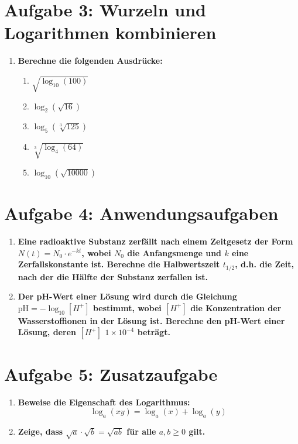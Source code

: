 \section*{\small Aufgabe 3: Wurzeln und Logarithmen kombinieren}
\begin{enumerate}
    \item \textbf{Berechne die folgenden Ausdrücke:}
    \begin{enumerate}
        \item \(\sqrt{\log_{10}(100)}\)
        \item \(\log_{2}(\sqrt{16})\)
        \item \(\log_{5}(\sqrt[3]{125})\)
        \item \(\sqrt[3]{\log_{4}(64)}\)
        \item \(\log_{10}(\sqrt{10000})\)
    \end{enumerate}
\end{enumerate}

\section*{\small Aufgabe 4: Anwendungsaufgaben}
\begin{enumerate}
    \item \textbf{Eine radioaktive Substanz zerfällt nach einem Zeitgesetz der Form \( N(t) = N_0 \cdot e^{-kt} \), wobei \(N_0\) die Anfangsmenge und \(k\) eine Zerfallskonstante ist. Berechne die Halbwertszeit \(t_{1/2}\), d.h. die Zeit, nach der die Hälfte der Substanz zerfallen ist.}
    
    \item \textbf{Der pH-Wert einer Lösung wird durch die Gleichung \( \text{pH} = -\log_{10}[H^+] \) bestimmt, wobei \([H^+]\) die Konzentration der Wasserstoffionen in der Lösung ist. Berechne den pH-Wert einer Lösung, deren \([H^+]\) \(1 \times 10^{-4}\) beträgt.}
\end{enumerate}

\section*{\small Aufgabe 5: Zusatzaufgabe}
\begin{enumerate}
    \item \textbf{Beweise die Eigenschaft des Logarithmus:}
    \[
    \log_{a}(xy) = \log_{a}(x) + \log_{a}(y)
    \]

    \item \textbf{Zeige, dass \( \sqrt{a} \cdot \sqrt{b} = \sqrt{ab} \) für alle \( a, b \geq 0 \) gilt.}
\end{enumerate}

